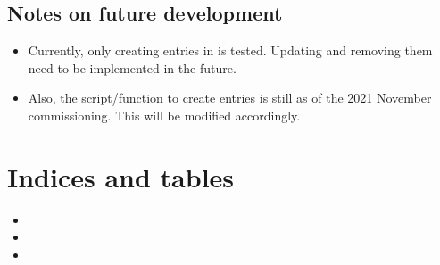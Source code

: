 \documentclass[letterpaper,10pt,english]{sphinxmanual}
\begin{document}
\section{Notes on future development}
\label{\detokenize{input_target_list:notes-on-future-development}}\begin{itemize}
\item {} 
\sphinxAtStartPar
Currently, only creating entries in  is tested. Updating and removing them need to be implemented in the future.

\item {} 
\sphinxAtStartPar
Also, the script/function to create entries is still as of the 2021 November commissioning. This will be modified accordingly.

\end{itemize}


\chapter{Indices and tables}
\label{\detokenize{index:indices-and-tables}}\begin{itemize}
\item {} 
\sphinxAtStartPar
{}

\item {} 
\sphinxAtStartPar
{}

\item {} 
\sphinxAtStartPar
{}

\end{itemize}



\renewcommand{\indexname}{Index}
\printindex
\end{document}
